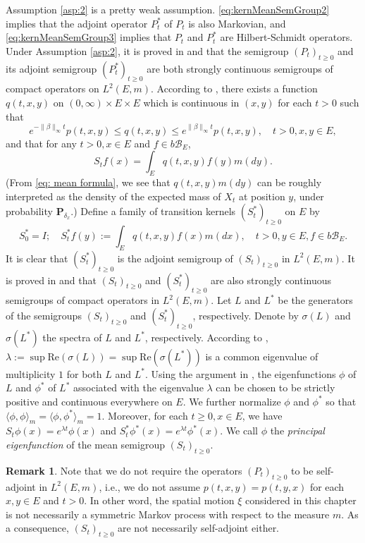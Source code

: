 \documentclass[UTF8]{pkuthss}
\theoremstyle{plain}
\theoremstyle{definition}
\newtheorem{rem}[thm]{Remark}
\numberwithin{equation}{section}
\begin{document}
	Assumption \ref{asp:2} is a pretty weak assumption. \eqref{eq:kernMeanSemGroup2} implies that the adjoint operator $P^*_t$
of $P_t$ is also Markovian, and  \eqref{eq:kernMeanSemGroup3} implies that
$P_t$ and $P^*_t$ are Hilbert-Schmidt operators.
	Under Assumption \ref{asp:2}, it is proved in \cite{RenSongZhang2015Limit} and \cite{RenSongZhang2017Central} that the semigroup $(P_t)_{t \geq 0}$ and its adjoint semigroup $(P^*_t)_{t \geq 0}$ are both strongly continuous semigroups of compact operators on $L^2(E,m)$.
	According to \cite[Lemma 2.1]{RenSongZhang2015Limit}, there exists a function $q(t,x,y)$ on $(0,\infty) \times E \times E$ which is continuous in $(x,y)$ for each $t>0$ such that
\[
	e^{-\|\beta\|_\infty t} p(t,x,y)
	\leq q(t,x,y)
	\leq e^{\|\beta\|_\infty t} p(t,x,y),
	\quad t>0, x, y\in E,
\]
	and that for any $t>0, x\in E$ and $f \in b\mathscr B_E$,
\begin{equation}\label{eq: density of S}
	S_t f(x)
	= \int_E q(t,x,y) f(y) m(dy).
\end{equation}
	(From \eqref{eq: mean formula}, we see that $q(t,x,y) m(dy)$ can be
	roughly interpreted as the density of the expected mass of $X_t$ at position $y$,
	under probability $\mathbf P_{\delta_x}$.)
	Define a family of transition kernels $(S^*_t)_{t \geq 0}$ on $E$ by
\[
	S^*_0 = I;
	\quad S^*_t f(y)
	:= \int_E q(t,x,y) f(x) m(dx),
	\quad t>0, y\in E, f\in b\mathscr B_E.
\]
	It is clear that $(S^*_t)_{t \geq 0}$ is the adjoint semigroup of $(S_t)_{t \geq 0}$ in $L^2(E,m)$.
	It is proved in \cite{RenSongZhang2015Limit} and \cite{RenSongZhang2017Central} that $(S_t)_{t \geq 0}$ and $(S^*_t)_{t \geq 0}$ are also strongly continuous semigroups of compact operators in $L^2(E,m)$.
	Let $L$ and $L^*$ be the generators of the semigroups $(S_t)_{t \geq 0}$ and $(S^*_t)_{t \geq 0}$, respectively.
	Denote by $\sigma(L)$ and $\sigma(L^*)$ the spectra of $L$ and $L^*$, respectively.
	According to \cite[Theorem V.6.6.]{Schaefer1974Banach}, $\lambda := \sup \text{Re}(\sigma(L)) = \sup \text{Re}(\sigma(L^*))$ is a common eigenvalue of multiplicity $1$ for both $L$ and $L^*$.
	Using the argument in \cite{RenSongZhang2015Limit}, the eigenfunctions $\phi$ of $L$ and $\phi^*$ of $L^*$ associated with the eigenvalue $\lambda$ can be chosen to be strictly positive and continuous everywhere on $E$.
	We further normalize $\phi$ and $\phi^*$ so that $\langle\phi, \phi\rangle_m = \langle\phi,\phi^*\rangle_m = 1$.
	Moreover, for each $t\geq 0,x\in E$, we have $S_t \phi(x) = e^{\lambda t} \phi(x)$ and $S^*_t \phi^*(x) = e^{\lambda t} \phi^*(x)$.
	We call $\phi$ the \emph{principal eigenfunction} of the mean semigroup $(S_t)_{t\geq 0}$.
\begin{rem}
	Note that we do not require the operators $(P_t)_{t\geq 0}$ to be self-adjoint in $L^2(E,m)$, i.e., we do not assume $p(t,x,y)= p(t,y,x)$ for each $x,y\in E$ and $t>0$. In other word, the spatial motion $\xi$ considered in this chapter is not necessarily a symmetric Markov process with respect to the measure $m$.
	As a consequence, $(S_t)_{t\geq 0}$ are not necessarily self-adjoint either.
	\end{rem}
\end{document}
